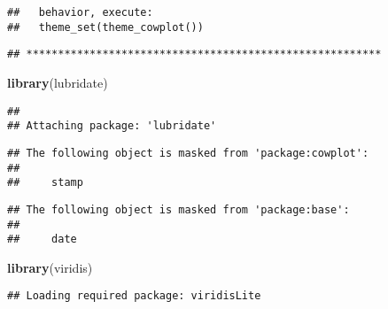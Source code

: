 \documentclass[
]{article}
\newenvironment{Shaded}{\begin{snugshade}}{\end{snugshade}}
\newcommand{\CommentTok}[1]{\textcolor[rgb]{0.56,0.35,0.01}{\textit{#1}}}
\newcommand{\KeywordTok}[1]{\textcolor[rgb]{0.13,0.29,0.53}{\textbf{#1}}}
\newcommand{\NormalTok}[1]{#1}
\newcommand{\OperatorTok}[1]{\textcolor[rgb]{0.81,0.36,0.00}{\textbf{#1}}}
\newcommand{\StringTok}[1]{\textcolor[rgb]{0.31,0.60,0.02}{#1}}
\begin{document}
\begin{verbatim}
##   behavior, execute:
##   theme_set(theme_cowplot())
\end{verbatim}

\begin{verbatim}
## ********************************************************
\end{verbatim}

\begin{Shaded}
\begin{Highlighting}[]
\KeywordTok{library}\NormalTok{(lubridate)}
\end{Highlighting}
\end{Shaded}

\begin{verbatim}
## 
## Attaching package: 'lubridate'
\end{verbatim}

\begin{verbatim}
## The following object is masked from 'package:cowplot':
## 
##     stamp
\end{verbatim}

\begin{verbatim}
## The following object is masked from 'package:base':
## 
##     date
\end{verbatim}

\begin{Shaded}
\begin{Highlighting}[]
\KeywordTok{library}\NormalTok{(viridis)}
\end{Highlighting}
\end{Shaded}

\begin{verbatim}
## Loading required package: viridisLite
\end{verbatim}

\begin{Shaded}
\end{Shaded}
\end{document}
